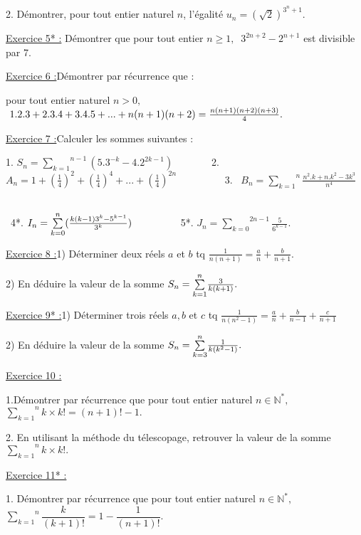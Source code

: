 \documentclass{article}
\begin{document}
2. D\'{e}montrer, pour tout entier naturel $n$, l'\'{e}galit\'{e} $%
u_{n}=\left( \sqrt{2}\right) ^{3^{n}+1}.$

\underline{Exercice 5* :} D\'{e}montrer que pour tout entier $n\geq 1,$ $\
3^{2n+2}-2^{n+1}$ est divisible par 7.

\underline{Exercice 6 :}D\'{e}montrer par r\'{e}currence que :

pour tout entier naturel $n>0,$ \ $\ 1.2.3+2.3.4+3.4.5+...+n(n+1)(n+2)=\frac{%
n(n+1)(n+2)(n+3)}{4}.$

\underline{Exercice 7 :}Calculer les sommes suivantes :

1. $S_{n}=\overset{n-1}{\underset{k=1}{\sum }}(5.3^{-k}-4.2^{2k-1})$ \ \ \ \
\ \ \ 2. $A_{n}=1+\left( \frac{1}{4}\right) ^{2}+\left( \frac{1}{4}\right)
^{4}+...+\left( \frac{1}{4}\right) ^{2n}$ \ \ \ \ \ \ \ \ \ 3. \ $B_{n}=%
\overset{n}{\underset{k=1}{\sum }}\frac{n^{2}.k+n.k^{2}-3k^{3}}{n^{4}}$ \ \
\ \ \ \ \ \ \ \ \ \ \ \ \ \ \ \ \ \ \ 

\ 4*. $I_{n}=\overset{n}{\underset{k=0}{\sum }}(\frac{k(k-1)3^{k}-5^{k-1}}{%
3^{k}})$ \ \ \ \ \ \ \ \ \ 5*. $J_{n}=\overset{2n-1}{\underset{k=0}{\sum }}%
\frac{5}{6^{k-1}}.$

\bigskip

\underline{Exercice 8 :}1) D\'{e}terminer deux r\'{e}els $a$ et $b$ tq $%
\frac{1}{n(n+1)}=\frac{a}{n}+\frac{b}{n+1}.$

2) En d\'{e}duire la valeur de la somme $S_{n}=\overset{n}{\underset{k=1}{%
\sum }}\frac{3}{k(k+1)}.$

\underline{Exercice 9* :}1) D\'{e}terminer trois r\'{e}els $a,b$ et $c$ tq $%
\frac{1}{n(n^{2}-1)}=\frac{a}{n}+\frac{b}{n-1}+\frac{c}{n+1}$

2) En d\'{e}duire la valeur de la somme $S_{n}=\overset{n}{\underset{k=3}{%
\sum }}\frac{1}{k(k^{2}-1)}.$

\underline{Exercice 10 :}

1.D\'{e}montrer par r\'{e}currence que pour tout entier naturel $n\in 
\mathbb{N}
^{\ast },$ $\overset{n}{\underset{k=1}{\sum }}k\times k!=\left( n+1\right)
!-1.$

2. En utilisant la m\'{e}thode du t\'{e}lescopage, retrouver la valeur de la
somme $\overset{n}{\underset{k=1}{\sum }}k\times k!.$

\underline{Exercice 11* :}

1. D\'{e}montrer par r\'{e}currence que pour tout entier naturel $n\in 
\mathbb{N}
^{\ast },$ $\overset{n}{\underset{k=1}{\sum }}\dfrac{k}{\left( k+1\right) !}%
=1-\dfrac{1}{\left( n+1\right) !}.$
\end{document}
